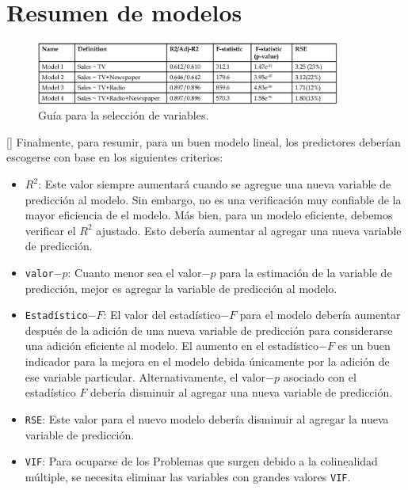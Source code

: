 \section{Resumen de modelos}

\begin{figure}
	\centering
	\includegraphics[width=10cm,keepaspectratio=true]{./images/modelsGuide.png}
	\caption{Guía para la selección de variables.}
	\label{fig:modelsGuide}
\end{figure}


[]{}
Finalmente, para resumir, para un buen modelo lineal, los predictores deberían escogerse con base en los siguientes criterios:
\begin{itemize}
	\item \texttt{$R^2$}: Este valor siempre aumentará cuando se agregue una nueva variable de predicción al
	modelo. Sin embargo, no es una verificación muy confiable de la mayor eficiencia de
	el modelo. Más bien, para un modelo eficiente, debemos verificar el $R^2$ ajustado.
	Esto debería aumentar al agregar una nueva variable de predicción.
	\item \texttt{valor$-p$}: Cuanto menor sea el valor$-p$ para la estimación de la variable de predicción,
	mejor es agregar la variable de predicción al modelo.
	\item \texttt{Estadístico$-F$}: El valor del estadístico$-F$ para el modelo debería aumentar después de
	la adición de una nueva variable de predicción para considerarse una
	adición eficiente al modelo. El aumento en el estadístico$-F$ es un buen indicador para la mejora en el modelo debida únicamente por la adición de ese variable particular. Alternativamente, el valor$-p$ asociado con el estadístico $F$ debería disminuir al agregar una nueva variable de predicción. 
	\item \texttt{RSE}: Este valor para el nuevo modelo debería disminuir al agregar
	la nueva variable de predicción.
	\item \texttt{VIF}: Para ocuparse de los Problemas que surgen debido a la colinealidad múltiple, se necesita
	eliminar las variables con grandes valores \texttt{VIF}.
\end{itemize}

